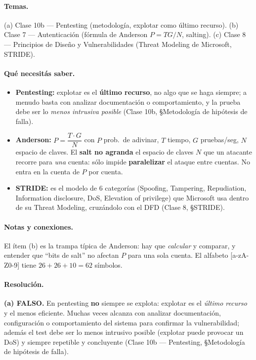 \paragraph{Temas.} (a) Clase 10b — Pentesting (metodología, explotar como último recurso).
(b) Clase 7 — Autenticación (fórmula de Anderson $P=TG/N$, salting). (c) Clase 8 —
Principios de Diseño y Vulnerabilidades (Threat Modeling de Microsoft, STRIDE).

\paragraph{Qué necesitás saber.}
\begin{itemize}
  \item \textbf{Pentesting:} explotar es el \textbf{último recurso}, no algo que se haga
        siempre; a menudo basta con analizar documentación o comportamiento, y la prueba debe
        ser lo \emph{menos intrusiva posible} (Clase 10b, \S Metodología de hipótesis de falla).
  \item \textbf{Anderson:} $P = \dfrac{T\cdot G}{N}$ con $P$ prob.\ de adivinar, $T$ tiempo,
        $G$ pruebas/seg, $N$ espacio de claves. El \textbf{salt no agranda} el espacio de
        claves $N$ que un atacante recorre para \emph{una} cuenta: sólo impide
        \textbf{paralelizar} el ataque entre cuentas. No entra en la cuenta de $P$ por cuenta.
  \item \textbf{STRIDE:} es el modelo de 6 categorías (Spoofing, Tampering, Repudiation,
        Information disclosure, DoS, Elevation of privilege) que Microsoft usa dentro de su
        Threat Modeling, cruzándolo con el DFD (Clase 8, \S STRIDE).
\end{itemize}

\paragraph{Notas y conexiones.} El ítem (b) es la trampa típica de Anderson: hay que
\emph{calcular} y comparar, y entender que ``bits de salt'' no afectan $P$ para una sola
cuenta. El alfabeto [a-zA-Z0-9] tiene $26+26+10 = 62$ símbolos.

\paragraph{Resolución.}

\textbf{(a) FALSO.} En pentesting \textbf{no} siempre se explota: explotar es el
\emph{último recurso} y el menos eficiente. Muchas veces alcanza con analizar documentación,
configuración o comportamiento del sistema para confirmar la vulnerabilidad; además el test
debe ser lo menos intrusivo posible (explotar puede provocar un DoS) y siempre repetible y
concluyente (Clase 10b — Pentesting, \S Metodología de hipótesis de falla).

